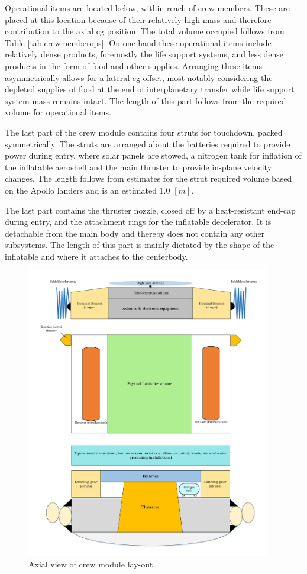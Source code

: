 Operational items are located below, within reach of crew members. These are placed at this location because of their relatively high mass and therefore contribution to the axial \gls{cg} position. The total volume occupied follows from Table \ref{tab:crewmemberops}. On one hand these operational items include relatively dense products, foremostly the life support systems, and less dense products in the form of food and other supplies. Arranging these items asymmetrically allows for a lateral \gls{cg} offset, most notably considering the depleted supplies of food at the end of interplanetary transfer while life support system mass remains intact. The length of this part follows from the required volume for operational items.

The last part of the crew module contains four struts for touchdown, packed symmetrically. The struts are arranged about the batteries required to provide power during entry, where solar panels are stowed, a nitrogen tank for inflation of the inflatable aeroshell and the main thruster to provide in-plane velocity changes. The length follows from estimates for the strut required volume based on the Apollo landers and is an estimated 1.0 $[m]$. 

The last part contains the thruster nozzle, closed off by a heat-resistant end-cap during entry, and the attachment rings for the inflatable decelerator. It is detachable from the main body and thereby does not contain any other subsystems. The length of this part is mainly dictated by the shape of the inflatable and where it attaches to the centerbody.

\begin{figure}[h]
		\centering
		\includegraphics[width=0.95\textwidth]{./Figure/CrewModule/Axialview.pdf}
		\caption{Axial view of crew module lay-out}
		\label{fig:axview}
\end{figure}

